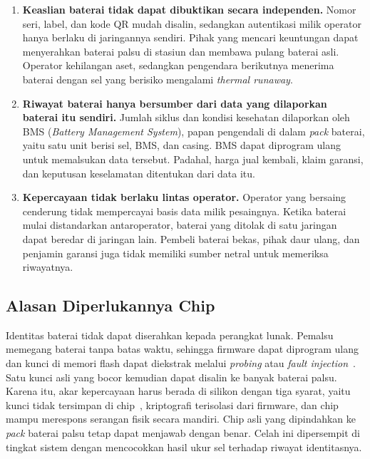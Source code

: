 \documentclass[11pt,a4paper]{article}
\begin{document}
\begin{enumerate}[label=\textbf{P\arabic*.}, leftmargin=2.2em]
  \item \textbf{Keaslian baterai tidak dapat dibuktikan secara independen.} Nomor seri, label, dan kode QR mudah disalin, sedangkan autentikasi milik operator hanya berlaku di jaringannya sendiri. Pihak yang mencari keuntungan dapat menyerahkan baterai palsu di stasiun dan membawa pulang baterai asli. Operator kehilangan aset, sedangkan pengendara berikutnya menerima baterai dengan sel yang berisiko mengalami \emph{thermal runaway}.
  \item \textbf{Riwayat baterai hanya bersumber dari data yang dilaporkan baterai itu sendiri.} Jumlah siklus dan kondisi kesehatan dilaporkan oleh BMS (\emph{Battery Management System}), papan pengendali di dalam \emph{pack} baterai, yaitu satu unit berisi sel, BMS, dan casing. BMS dapat diprogram ulang untuk memalsukan data tersebut. Padahal, harga jual kembali, klaim garansi, dan keputusan keselamatan ditentukan dari data itu.
  \item \textbf{Kepercayaan tidak berlaku lintas operator.} Operator yang bersaing cenderung tidak mempercayai basis data milik pesaingnya. Ketika baterai mulai distandarkan antaroperator, baterai yang ditolak di satu jaringan dapat beredar di jaringan lain. Pembeli baterai bekas, pihak daur ulang, dan penjamin garansi juga tidak memiliki sumber netral untuk memeriksa riwayatnya.
\end{enumerate}

\subsection{Alasan Diperlukannya Chip}

Identitas baterai tidak dapat diserahkan kepada perangkat lunak. Pemalsu memegang baterai tanpa batas waktu, sehingga firmware dapat diprogram ulang dan kunci di memori flash dapat diekstrak melalui \emph{probing} atau \emph{fault injection}~\cite{barel}. Satu kunci asli yang bocor kemudian dapat disalin ke banyak baterai palsu. Karena itu, akar kepercayaan harus berada di silikon dengan tiga syarat, yaitu kunci tidak tersimpan di chip~\cite{suh,maes}, kriptografi terisolasi dari firmware, dan chip mampu merespons serangan fisik secara mandiri. Chip asli yang dipindahkan ke \emph{pack} baterai palsu tetap dapat menjawab dengan benar. Celah ini dipersempit di tingkat sistem dengan mencocokkan hasil ukur sel terhadap riwayat identitasnya.
\end{document}
